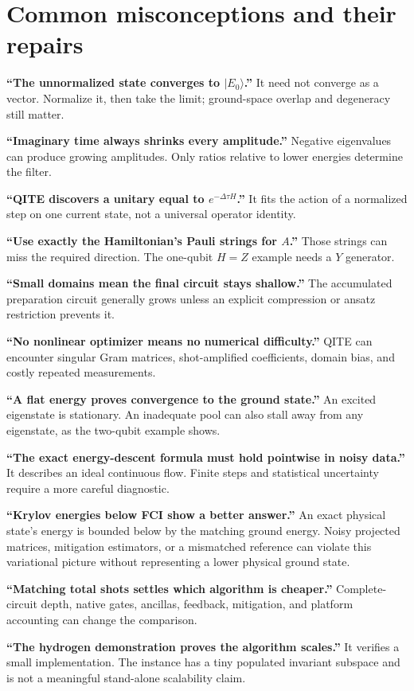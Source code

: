 \documentclass[11pt,a4paper]{article}
\newcommand{\ket}[1]{\lvert #1\rangle}
\newcommand{\dt}{\Delta\tau}
\newcommand{\lesson}[2]{\clearpage\section{#1}\label{#2}}
\begin{document}
\lesson{Common misconceptions and their repairs}{sec:faq}
\textbf{``The unnormalized state converges to $\ket{E_0}$.''} It need not converge as a vector. Normalize it, then take the limit; ground-space overlap and degeneracy still matter.

\textbf{``Imaginary time always shrinks every amplitude.''} Negative eigenvalues can produce growing amplitudes. Only ratios relative to lower energies determine the filter.

\textbf{``QITE discovers a unitary equal to $e^{-\dt H}$.''} It fits the action of a normalized step on one current state, not a universal operator identity.

\textbf{``Use exactly the Hamiltonian's Pauli strings for $A$.''} Those strings can miss the required direction. The one-qubit $H=Z$ example needs a $Y$ generator.

\textbf{``Small domains mean the final circuit stays shallow.''} The accumulated preparation circuit generally grows unless an explicit compression or ansatz restriction prevents it.

\textbf{``No nonlinear optimizer means no numerical difficulty.''} QITE can encounter singular Gram matrices, shot-amplified coefficients, domain bias, and costly repeated measurements.

\textbf{``A flat energy proves convergence to the ground state.''} An excited eigenstate is stationary. An inadequate pool can also stall away from any eigenstate, as the two-qubit example shows.

\textbf{``The exact energy-descent formula must hold pointwise in noisy data.''} It describes an ideal continuous flow. Finite steps and statistical uncertainty require a more careful diagnostic.

\textbf{``Krylov energies below FCI show a better answer.''} An exact physical state's energy is bounded below by the matching ground energy. Noisy projected matrices, mitigation estimators, or a mismatched reference can violate this variational picture without representing a lower physical ground state.

\textbf{``Matching total shots settles which algorithm is cheaper.''} Complete-circuit depth, native gates, ancillas, feedback, mitigation, and platform accounting can change the comparison.

\textbf{``The hydrogen demonstration proves the algorithm scales.''} It verifies a small implementation. The instance has a tiny populated invariant subspace and is not a meaningful stand-alone scalability claim.
\end{document}
